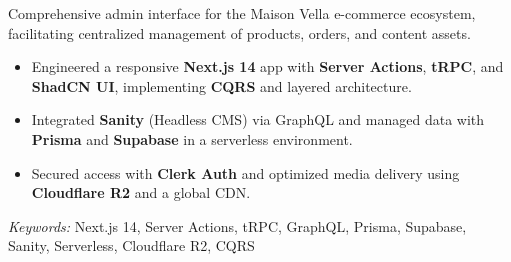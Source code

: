 \nointent
{}


\nointent
Comprehensive admin interface for the Maison Vella e-commerce ecosystem, facilitating centralized management of products, orders, and content assets.

\begin{itemize}
    \item Engineered a responsive \textbf{Next.js 14} app with \textbf{Server Actions}, \textbf{tRPC}, and \textbf{ShadCN UI}, implementing \textbf{CQRS} and layered architecture.
    \item Integrated \textbf{Sanity} (Headless CMS) via GraphQL and managed data with \textbf{Prisma} and \textbf{Supabase} in a serverless environment.
    \item Secured access with \textbf{Clerk Auth} and optimized media delivery using \textbf{Cloudflare R2} and a global CDN.
\end{itemize}

\nointent
\textit{Keywords:} Next.js 14, Server Actions, tRPC, GraphQL, Prisma, Supabase, Sanity, Serverless, Cloudflare R2, CQRS
